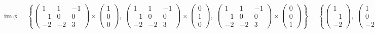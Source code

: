 \documentclass{article}
\newcommand{\im}{\text{im}\,}
\begin{document}
$$\im\phi = \left\{ \left(\begin{array}{rrr}
1 & 1 & -1 \\
-1 & 0 & 0 \\
-2 & -2 & 3
\end{array}\right) \times \begin{pmatrix}
1 \\ 0 \\ 0
\end{pmatrix},\;\left(\begin{array}{rrr}
1 & 1 & -1 \\
-1 & 0 & 0 \\
-2 & -2 & 3
\end{array}\right) \times \begin{pmatrix}
0 \\ 1 \\ 0
\end{pmatrix},\;\left(\begin{array}{rrr}
1 & 1 & -1 \\
-1 & 0 & 0 \\
-2 & -2 & 3
\end{array}\right) \times \begin{pmatrix}
0\\ 0 \\ 1
\end{pmatrix} \right\} = \left\{\begin{pmatrix}
1 \\ -1 \\ -2
\end{pmatrix},\;\begin{pmatrix}
1 \\ 0 \\ -2
\end{pmatrix},\;\begin{pmatrix}
-1 \\ 0 \\ -2
\end{pmatrix}\right\}$$
\end{document}
